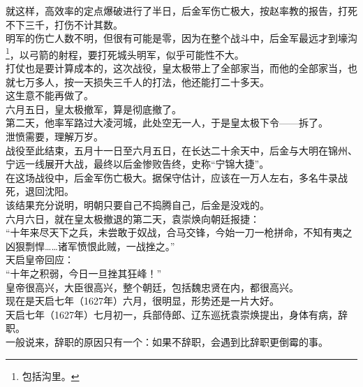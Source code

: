 \begin{multicols}{\theparacolNo}
就这样，高效率的定点爆破进行了半日，后金军伤亡极大，按赵率教的报告，打死不下三千，打伤不计其数。\\

明军的伤亡人数不明，但很有可能是零，因为在整个战斗中，后金军最远才到壕沟\footnote{包括沟里。}，以弓箭的射程，要打死城头明军，似乎可能性不大。\\

打仗也是要计算成本的，这次战役，皇太极带上了全部家当，而他的全部家当，也就七万多人，按一天损失三千人的打法，他还能打二十多天。\\

这生意不能再做了。\\

六月五日，皇太极撤军，算是彻底撤了。\\

第二天，他率军路过大凌河城，此处空无一人，于是皇太极下令——拆了。\\

泄愤需要，理解万岁。\\

战役至此结束，五月十一日至六月五日，在长达二十余天中，后金与大明在锦州、宁远一线展开大战，最终以后金惨败告终，史称“宁锦大捷”。\\

在这场战役中，后金军伤亡极大。据保守估计，应该在一万人左右，多名牛录战死，退回沈阳。\\

该结果充分说明，明朝只要自己不捣腾自己，后金是没戏的。\\

六月六日，就在皇太极撤退的第二天，袁崇焕向朝廷报捷：\\

“十年来尽天下之兵，未尝敢于奴战，合马交锋，今始一刀一枪拼命，不知有夷之凶狠剽悍……诸军愤恨此贼，一战挫之。”\\

天启皇帝回应：\\

“十年之积弱，今日一旦挫其狂峰！”\\

皇帝很高兴，大臣很高兴，整个朝廷，包括魏忠贤在内，都很高兴。\\

现在是天启七年（1627年）六月，很明显，形势还是一片大好。\\

天启七年（1627年）七月初一，兵部侍郎、辽东巡抚袁崇焕提出，身体有病，辞职。\\

一般说来，辞职的原因只有一个：如果不辞职，会遇到比辞职更倒霉的事。\\


\end{multicols}
